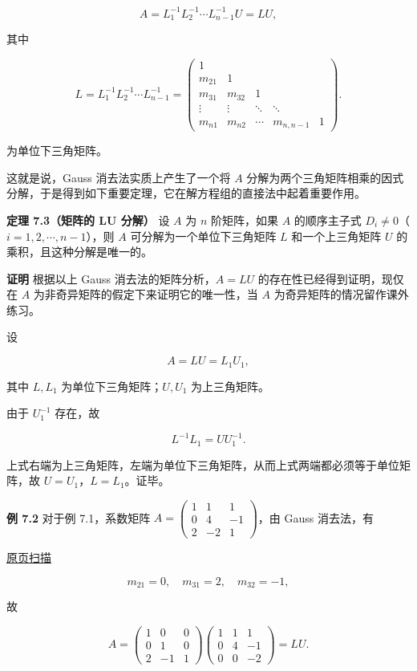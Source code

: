 \documentclass[
  10pt,
  fontset=fandol]{ctexart}
\begin{document}
\[A=L_1^{-1}L_2^{-1}\cdots L_{n-1}^{-1}U=LU,\]

其中

\[
L=L_1^{-1}L_2^{-1}\cdots L_{n-1}^{-1}
=\begin{pmatrix}
1&&&&\\
m_{21}&1&&&\\
m_{31}&m_{32}&1&&\\
\vdots&\vdots&\ddots&\ddots&\\
m_{n1}&m_{n2}&\cdots&m_{n,n-1}&1
\end{pmatrix}.
\]

为单位下三角矩阵。

这就是说，Gauss 消去法实质上产生了一个将 \(A\) 分解为两个三角矩阵相乘的因式分解，于是得到如下重要定理，它在解方程组的直接法中起着重要作用。

\textbf{定理 7.3（矩阵的 LU 分解）} 设 \(A\) 为 \(n\) 阶矩阵，如果 \(A\) 的顺序主子式 \(D_i\ne0\)（\(i=1,2,\cdots,n-1\)），则 \(A\) 可分解为一个单位下三角矩阵 \(L\) 和一个上三角矩阵 \(U\) 的乘积，且这种分解是唯一的。

\textbf{证明} 根据以上 Gauss 消去法的矩阵分析，\(A=LU\) 的存在性已经得到证明，现仅在 \(A\) 为非奇异矩阵的假定下来证明它的唯一性，当 \(A\) 为奇异矩阵的情况留作课外练习。

设

\[A=LU=L_1U_1,\]

其中 \(L,L_1\) 为单位下三角矩阵；\(U,U_1\) 为上三角矩阵。

由于 \(U_1^{-1}\) 存在，故

\[L^{-1}L_1=UU_1^{-1}.\]

上式右端为上三角矩阵，左端为单位下三角矩阵，从而上式两端都必须等于单位矩阵，故 \(U=U_1\)，\(L=L_1\)。证毕。

\textbf{例 7.2} 对于例 7.1，系数矩阵 \(A=\begin{pmatrix}1&1&1\\0&4&-1\\2&-2&1\end{pmatrix}\)，由 Gauss 消去法，有

\href{../../source-images/pdf-183.jpeg}{原页扫描}

\[m_{21}=0,\quad m_{31}=2,\quad m_{32}=-1,\]

故

\[
A=\begin{pmatrix}1&0&0\\0&1&0\\2&-1&1\end{pmatrix}
\begin{pmatrix}1&1&1\\0&4&-1\\0&0&-2\end{pmatrix}=LU.
\]
\end{document}
